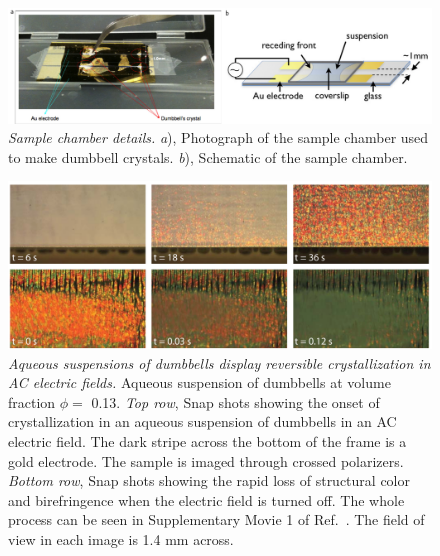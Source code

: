 \begin{figure}[htbp]
\centering
\includegraphics[width=1.0\textwidth]{figures/CsuppFigure1.pdf}
\caption{\label{fig:schematic} \emph{Sample chamber details.}
	\emph{a}), Photograph of the sample chamber used to make dumbbell crystals.
	\emph{b}), Schematic of the sample chamber.}
\end{figure}

\begin{figure}[htbp]
\centering
\includegraphics[width=1.0\textwidth]{figures/CFigure2.pdf}
\caption{\label{fig:device} \emph{Aqueous suspensions of dumbbells display reversible crystallization in AC electric fields.}
	Aqueous suspension of dumbbells at volume fraction  $\phi=$ 0.13.
  	\emph{Top row}, Snap shots showing the onset of crystallization in an aqueous suspension of dumbbells in an AC electric field. The dark stripe across the bottom of the frame is a gold electrode. The sample is imaged through crossed polarizers.
  	\emph{Bottom row}, Snap shots showing the rapid loss of structural color and birefringence when the electric field is turned off. The whole process can be seen in Supplementary Movie 1 of Ref.~\cite{Forster:2011}. The field of view in each image is 1.4 mm across.}
\end{figure}

